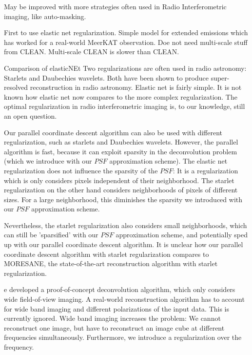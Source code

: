 

May be improved with more strategies often used in Radio Interferometric imaging, like auto-masking.

First to use elastic net regularization. Simple model for extended emissions which has worked for a real-world MeerKAT observation.
Doe not need multi-scale stuff from CLEAN. 
Multi-scale CLEAN is slower than CLEAN.




Comparison of elasticNEt
Two regularizations are often used in radio astronomy: Starlets \cite{starck2015starlet} and Daubechies wavelets\cite{carrillo2014purify}. Both have been shown to produce super-resolved reconstruction in radio astronomy\cite{dabbech2015moresane, dabbech2018cygnus}. Elastic net is fairly simple. It is not known how elastic net now compares to the more complex regularization.
The optimal regularization in radio interferometric imaging is, to our knowledge, still an open question. 

Our parallel coordinate descent algorithm can also be used with different regularization, such as starlets and Daubechies wavelets. However, the parallel algorithm is fast, because it can exploit sparsity in the deconvolution problem (which we introduce with our $PSF$ approximation scheme). The elastic net regularization does not influence the sparsity of the $PSF$: It is a regularization which is only considers pixels independent of their neighborhood. The starlet regularization on the other hand considers neighborhoods of pixels of different sizes. For a large neighborhood, this diminishes the sparsity we introduced with our $PSF$ approximation scheme.  

Nevertheless, the starlet regularization also considers small neighborhoods, which can still be 'sparsified' with our $PSF$ approximation scheme, and potentially sped up with our parallel coordinate descent algorithm. It is unclear how our parallel coordinate descent algorithm with starlet regularization compares to MORESANE, the state-of-the-art reconstruction algorithm with starlet regularization.


e developed a proof-of-concept deconvolution algorithm, which only considers wide field-of-view imaging. A real-world reconstruction algorithm has to account for wide band imaging and different polarizations of the input data. This is currently ignored. Wide band imaging increases the problem: We cannot reconstruct one image, but have to reconstruct an image cube at different frequencies simultaneously. Furthermore, we introduce a regularization over the frequency.

